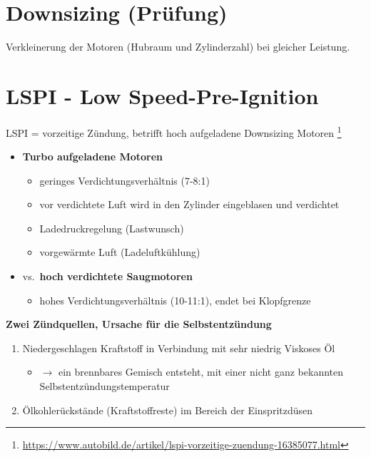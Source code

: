 \section{Downsizing (Prüfung)}\label{downsizing-pruefung}

Verkleinerung der Motoren (Hubraum und Zylinderzahl) bei gleicher
Leistung.

\section{LSPI - Low
Speed-Pre-Ignition}\label{lspi-low-speed-pre-ignition}

LSPI = vorzeitige Zündung, betrifft hoch aufgeladene Downsizing Motoren
\footnote{\url{https://www.autobild.de/artikel/lspi-vorzeitige-zuendung-16385077.html}}

\begin{itemize}
\item
  \textbf{Turbo aufgeladene Motoren}

  \begin{itemize}
  \item
    geringes Verdichtungsverhältnis (7-8:1)
  \item
    vor verdichtete Luft wird in den Zylinder eingeblasen und verdichtet
  \item
    Ladedruckregelung (Lastwunsch)
  \item
    vorgewärmte Luft (Ladeluftkühlung)
  \end{itemize}
\item
  vs.~\textbf{hoch verdichtete Saugmotoren}

  \begin{itemize}
  \item
    hohes Verdichtungsverhältnis (10-11:1), endet bei Klopfgrenze
  \end{itemize}
\end{itemize}

\textbf{Zwei Zündquellen, Ursache für die Selbstentzündung}

\begin{enumerate}
\item
  Niedergeschlagen Kraftstoff in Verbindung mit sehr niedrig Viskoses Öl

  \begin{itemize}
  \item
    $\to$ ein brennbares Gemisch entsteht, mit einer nicht ganz
    bekannten Selbstentzündungstemperatur
  \end{itemize}
\item
  Ölkohlerückstände (Kraftstoffreste) im Bereich der Einspritzdüsen
\end{enumerate}

